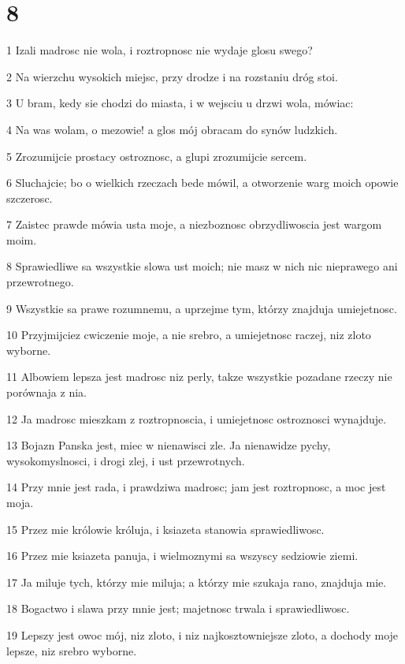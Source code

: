 \chapter{8}

\par 1 Izali madrosc nie wola, i roztropnosc nie wydaje glosu swego?
\par 2 Na wierzchu wysokich miejsc, przy drodze i na rozstaniu dróg stoi.
\par 3 U bram, kedy sie chodzi do miasta, i w wejsciu u drzwi wola, mówiac:
\par 4 Na was wolam, o mezowie! a glos mój obracam do synów ludzkich.
\par 5 Zrozumijcie prostacy ostroznosc, a glupi zrozumijcie sercem.
\par 6 Sluchajcie; bo o wielkich rzeczach bede mówil, a otworzenie warg moich opowie szczerosc.
\par 7 Zaistec prawde mówia usta moje, a niezboznosc obrzydliwoscia jest wargom moim.
\par 8 Sprawiedliwe sa wszystkie slowa ust moich; nie masz w nich nic nieprawego ani przewrotnego.
\par 9 Wszystkie sa prawe rozumnemu, a uprzejme tym, którzy znajduja umiejetnosc.
\par 10 Przyjmijciez cwiczenie moje, a nie srebro, a umiejetnosc raczej, niz zloto wyborne.
\par 11 Albowiem lepsza jest madrosc niz perly, takze wszystkie pozadane rzeczy nie porównaja z nia.
\par 12 Ja madrosc mieszkam z roztropnoscia, i umiejetnosc ostroznosci wynajduje.
\par 13 Bojazn Panska jest, miec w nienawisci zle. Ja nienawidze pychy, wysokomyslnosci, i drogi zlej, i ust przewrotnych.
\par 14 Przy mnie jest rada, i prawdziwa madrosc; jam jest roztropnosc, a moc jest moja.
\par 15 Przez mie królowie króluja, i ksiazeta stanowia sprawiedliwosc.
\par 16 Przez mie ksiazeta panuja, i wielmoznymi sa wszyscy sedziowie ziemi.
\par 17 Ja miluje tych, którzy mie miluja; a którzy mie szukaja rano, znajduja mie.
\par 18 Bogactwo i slawa przy mnie jest; majetnosc trwala i sprawiedliwosc.
\par 19 Lepszy jest owoc mój, niz zloto, i niz najkosztowniejsze zloto, a dochody moje lepsze, niz srebro wyborne.
